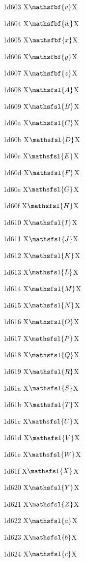 \documentclass[11pt]{article}
\begin{document}
1d603 X{\ensuremath{\mathsfbf{v}}}X

1d604 X{\ensuremath{\mathsfbf{w}}}X

1d605 X{\ensuremath{\mathsfbf{x}}}X

1d606 X{\ensuremath{\mathsfbf{y}}}X

1d607 X{\ensuremath{\mathsfbf{z}}}X

1d608 X{\ensuremath{\mathsfsl{A}}}X

1d609 X{\ensuremath{\mathsfsl{B}}}X

1d60a X{\ensuremath{\mathsfsl{C}}}X

1d60b X{\ensuremath{\mathsfsl{D}}}X

1d60c X{\ensuremath{\mathsfsl{E}}}X

1d60d X{\ensuremath{\mathsfsl{F}}}X

1d60e X{\ensuremath{\mathsfsl{G}}}X

1d60f X{\ensuremath{\mathsfsl{H}}}X

1d610 X{\ensuremath{\mathsfsl{I}}}X

1d611 X{\ensuremath{\mathsfsl{J}}}X

1d612 X{\ensuremath{\mathsfsl{K}}}X

1d613 X{\ensuremath{\mathsfsl{L}}}X

1d614 X{\ensuremath{\mathsfsl{M}}}X

1d615 X{\ensuremath{\mathsfsl{N}}}X

1d616 X{\ensuremath{\mathsfsl{O}}}X

1d617 X{\ensuremath{\mathsfsl{P}}}X

1d618 X{\ensuremath{\mathsfsl{Q}}}X

1d619 X{\ensuremath{\mathsfsl{R}}}X

1d61a X{\ensuremath{\mathsfsl{S}}}X

1d61b X{\ensuremath{\mathsfsl{T}}}X

1d61c X{\ensuremath{\mathsfsl{U}}}X

1d61d X{\ensuremath{\mathsfsl{V}}}X

1d61e X{\ensuremath{\mathsfsl{W}}}X

1d61f X{\ensuremath{\mathsfsl{X}}}X

1d620 X{\ensuremath{\mathsfsl{Y}}}X

1d621 X{\ensuremath{\mathsfsl{Z}}}X

1d622 X{\ensuremath{\mathsfsl{a}}}X

1d623 X{\ensuremath{\mathsfsl{b}}}X

1d624 X{\ensuremath{\mathsfsl{c}}}X
\end{document}
